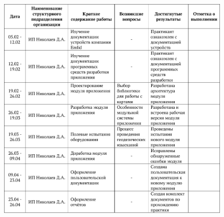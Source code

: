 \documentclass[pta]{../../../../scs-iam}
\begin{document}
\restoregeometry
\normalsize

\clearpage

\setcounter{page}{2}

{
  \parindent 0pt

  \begin{center}
    \begin{figure}[h!]
      \centering
      \setlength{\fboxsep}{0pt}
      \includegraphics[width=\textwidth]{table}
    \end{figure}
  \end{center}
}
\end{document}
